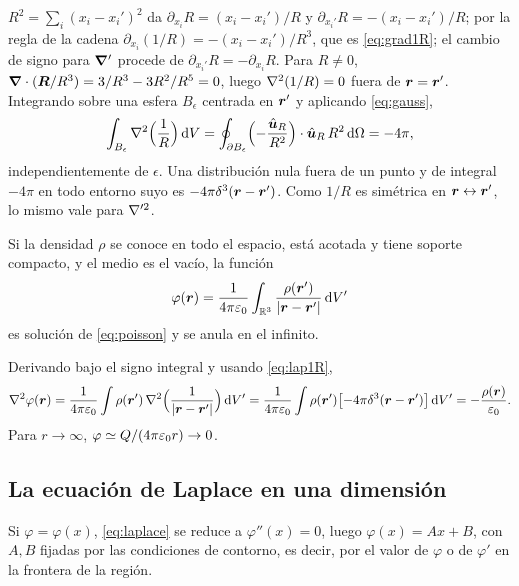 \documentclass[11pt,a4paper,twoside]{article}
\begin{document}
\begin{demostracion}
$R^{2}=\sum_i(x_i-x_i')^{2}$ da $\partial_{x_i}R=(x_i-x_i')/R$ y
$\partial_{x_i'}R=-(x_i-x_i')/R$; por la regla de la cadena
$\partial_{x_i}(1/R)=-(x_i-x_i')/R^{3}$, que es \eqref{eq:grad1R}; el cambio de signo para
$\bm{\nabla}'$ procede de $\partial_{x_i'}R=-\partial_{x_i}R$.
Para $R\neq0$, $\bm{\nabla}\cdot(\bm{R}/R^{3})=3/R^{3}-3R^{2}/R^{5}=0$, luego $\nabla^{2}(1/R)=0$ fuera de
$\bm{r}=\bm{r}'$. Integrando sobre una esfera $B_\epsilon$ centrada en $\bm{r}'$ y aplicando
\eqref{eq:gauss},
\[
  \int_{B_\epsilon}\nabla^{2}\Bigl(\frac1R\Bigr)\,\mathrm{d} V
  =\oint_{\partial B_\epsilon}\Bigl(-\frac{\hat{\bm{u}}_{R}}{R^{2}}\Bigr)\cdot\hat{\bm{u}}_{R}\,R^{2}\,\mathrm{d}\Omega=-4\pi ,
\]
independientemente de $\epsilon$. Una distribución nula fuera de un punto y de integral $-4\pi$
en todo entorno suyo es $-4\pi\delta^{3}(\bm{r}-\bm{r}')$. Como $1/R$ es simétrica en
$\bm{r}\leftrightarrow\bm{r}'$, lo mismo vale para $\nabla'^{2}$.
\end{demostracion}

\begin{proposicion}\label{prop:coulomb}
Si la densidad $\rho$ se conoce en todo el espacio, está acotada y tiene soporte compacto, y
el medio es el vacío, la función
\begin{equation}\label{eq:coulomb}
  \varphi(\bm{r})=\frac{1}{4\pi\varepsilon_{0}}\int_{\mathbb{R}^{3}}\frac{\rho(\bm{r}')}{\left\lvert \bm{r}-\bm{r}'\right\rvert}\,\mathrm{d} V'
\end{equation}
es solución de \eqref{eq:poisson} y se anula en el infinito.
\end{proposicion}

\begin{demostracion}
Derivando bajo el signo integral y usando \eqref{eq:lap1R},
\[
  \nabla^{2}\varphi(\bm{r})=\frac{1}{4\pi\varepsilon_{0}}\int\rho(\bm{r}')\,\nabla^{2}\Bigl(\frac{1}{\left\lvert \bm{r}-\bm{r}'\right\rvert}\Bigr)\,\mathrm{d} V'
  =\frac{1}{4\pi\varepsilon_{0}}\int\rho(\bm{r}')\bigl[-4\pi\delta^{3}(\bm{r}-\bm{r}')\bigr]\,\mathrm{d} V'=-\frac{\rho(\bm{r})}{\varepsilon_{0}}.
\]
Para $r\to\infty$, $\varphi\simeq Q/(4\pi\varepsilon_{0} r)\to0$.
\end{demostracion}

\subsection{La ecuación de Laplace en una dimensión}

\begin{ejemplo}
Si $\varphi=\varphi(x)$, \eqref{eq:laplace} se reduce a $\varphi''(x)=0$, luego
$\varphi(x)=Ax+B$, con $A,B$ fijadas por las condiciones de contorno, es decir, por el valor
de $\varphi$ o de $\varphi'$ en la frontera de la región.
\end{ejemplo}
\end{document}
